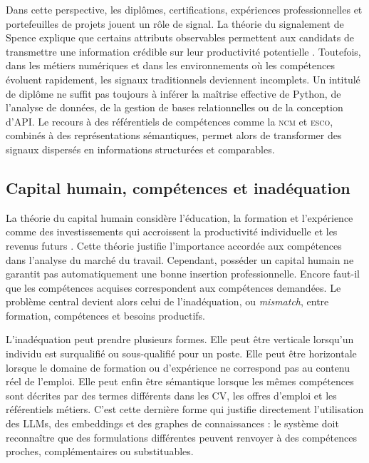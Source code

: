 \documentclass[12pt,twoside]{report}
\newcommand{\ESCO}{\textsc{esco}}
\newcommand{\NCM}{\textsc{ncm}}
\begin{document}
Dans cette perspective, les diplômes, certifications, expériences professionnelles et portefeuilles de projets jouent un rôle de signal. La théorie du signalement de Spence explique que certains attributs observables permettent aux candidats de transmettre une information crédible sur leur productivité potentielle \cite{spence1973job}. Toutefois, dans les métiers numériques et dans les environnements où les compétences évoluent rapidement, les signaux traditionnels deviennent incomplets. Un intitulé de diplôme ne suffit pas toujours à inférer la maîtrise effective de Python, de l'analyse de données, de la gestion de bases relationnelles ou de la conception d'API. Le recours à des référentiels de compétences comme la \NCM{} et \ESCO{}, combinés à des représentations sémantiques, permet alors de transformer des signaux dispersés en informations structurées et comparables.

\subsection{Capital humain, compétences et inadéquation}
La théorie du capital humain considère l'éducation, la formation et l'expérience comme des investissements qui accroissent la productivité individuelle et les revenus futurs \cite{becker1964human}. Cette théorie justifie l'importance accordée aux compétences dans l'analyse du marché du travail. Cependant, posséder un capital humain ne garantit pas automatiquement une bonne insertion professionnelle. Encore faut-il que les compétences acquises correspondent aux compétences demandées. Le problème central devient alors celui de l'inadéquation, ou \emph{mismatch}, entre formation, compétences et besoins productifs.

L'inadéquation peut prendre plusieurs formes. Elle peut être verticale lorsqu'un individu est surqualifié ou sous-qualifié pour un poste. Elle peut être horizontale lorsque le domaine de formation ou d'expérience ne correspond pas au contenu réel de l'emploi. Elle peut enfin être sémantique lorsque les mêmes compétences sont décrites par des termes différents dans les CV, les offres d'emploi et les référentiels métiers. C'est cette dernière forme qui justifie directement l'utilisation des LLMs, des embeddings et des graphes de connaissances : le système doit reconnaître que des formulations différentes peuvent renvoyer à des compétences proches, complémentaires ou substituables.
\end{document}
